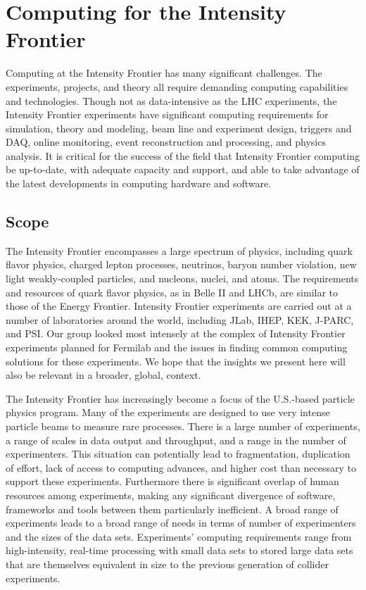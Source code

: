 \section{Computing for the Intensity Frontier}

Computing at the Intensity Frontier has many significant challenges. The
experiments, projects, and theory all require demanding computing capabilities
and technologies.  Though not as data-intensive as the LHC experiments, the Intensity Frontier
experiments have significant computing requirements for simulation,  theory
and modeling, beam line and experiment design, triggers and DAQ, online
monitoring, event reconstruction and processing, and physics analysis.  It is
critical for the success of the field that Intensity Frontier computing be up-to-date, with adequate 
capacity and support, and able to take advantage of the latest
developments in computing hardware and software.

\subsection{Scope}
The Intensity Frontier encompasses a large spectrum of physics, including quark flavor
physics,  charged lepton processes, neutrinos, baryon number violation,  new
light weakly-coupled particles, and nucleons, nuclei, and atoms.  The
requirements and resources of quark flavor physics, as in Belle II and LHCb,
are similar to those of the Energy Frontier. 
Intensity Frontier experiments are carried out at a number of laboratories 
around the world, including JLab, IHEP, KEK, J-PARC, and PSI.  
Our group looked most intensely at the complex of Intensity Frontier 
experiments planned for Fermilab and the issues in finding common 
computing solutions for these experiments.  
We hope that the insights we present here will also be relevant in a 
broader, global, context.

The Intensity Frontier has increasingly become a focus of the U.S.-based particle physics program. Many  of
the experiments are designed to use very intense particle beams to measure
rare processes. There is a large number of experiments, a range of scales
in data output and throughput, and a range in the number of experimenters.
This situation can potentially lead to fragmentation, duplication of effort, lack of
access to computing advances, and higher cost than necessary to support these experiments. 
Furthermore there is significant overlap of human resources among experiments, making any significant
divergence of  software, frameworks and tools between them particularly
inefficient.  A broad range of experiments leads to a broad range of needs in 
terms of number of experimenters and the sizes of the data sets. Experiments'
computing requirements range from high-intensity, real-time processing with 
small data sets to stored large data sets that are themselves equivalent in 
size to the previous generation of collider experiments. 

